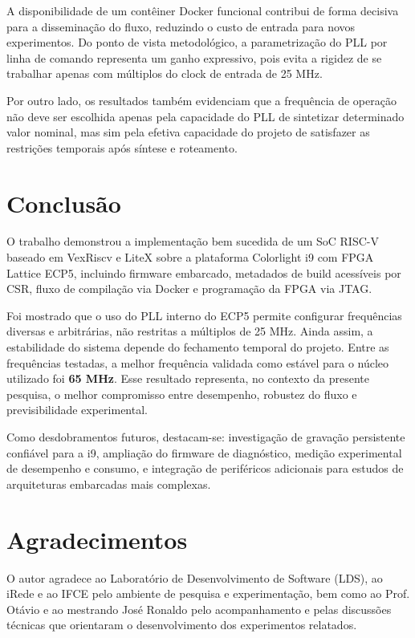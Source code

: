 \documentclass[10pt,twocolumn,a4paper]{article}
\begin{document}
A disponibilidade de um cont\^einer Docker funcional contribui de forma decisiva para a dissemina\c{c}\~ao do fluxo, reduzindo o custo de entrada para novos experimentos. Do ponto de vista metodol\'ogico, a parametriza\c{c}\~ao do PLL por linha de comando representa um ganho expressivo, pois evita a rigidez de se trabalhar apenas com m\'ultiplos do clock de entrada de 25 MHz.

Por outro lado, os resultados tamb\'em evidenciam que a frequ\^encia de opera\c{c}\~ao n\~ao deve ser escolhida apenas pela capacidade do PLL de sintetizar determinado valor nominal, mas sim pela efetiva capacidade do projeto de satisfazer as restri\c{c}\~oes temporais ap\'os s\'intese e roteamento.

\section{Conclus\~ao}
O trabalho demonstrou a implementa\c{c}\~ao bem sucedida de um SoC RISC-V baseado em VexRiscv e LiteX sobre a plataforma Colorlight i9 com FPGA Lattice ECP5, incluindo firmware embarcado, metadados de build acess\'iveis por CSR, fluxo de compila\c{c}\~ao via Docker e programa\c{c}\~ao da FPGA via JTAG.

Foi mostrado que o uso do PLL interno do ECP5 permite configurar frequ\^encias diversas e arbitr\'arias, n\~ao restritas a m\'ultiplos de 25 MHz. Ainda assim, a estabilidade do sistema depende do fechamento temporal do projeto. Entre as frequ\^encias testadas, a melhor frequ\^encia validada como est\'avel para o n\'ucleo utilizado foi \textbf{65 MHz}. Esse resultado representa, no contexto da presente pesquisa, o melhor compromisso entre desempenho, robustez do fluxo e previsibilidade experimental.

Como desdobramentos futuros, destacam-se: investiga\c{c}\~ao de grava\c{c}\~ao persistente confi\'avel para a i9, amplia\c{c}\~ao do firmware de diagn\'ostico, medi\c{c}\~ao experimental de desempenho e consumo, e integra\c{c}\~ao de perif\'ericos adicionais para estudos de arquiteturas embarcadas mais complexas.

\section*{Agradecimentos}
O autor agradece ao Laborat\'orio de Desenvolvimento de Software (LDS), ao iRede e ao IFCE pelo ambiente de pesquisa e experimenta\c{c}\~ao, bem como ao Prof. Ot\'avio e ao mestrando Jos\'e Ronaldo pelo acompanhamento e pelas discuss\~oes t\'ecnicas que orientaram o desenvolvimento dos experimentos relatados.
\end{document}
